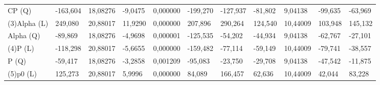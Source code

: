 \begin{table}[H]
{\begin{tabular}{lllllllllll}
\rowcolor[HTML]{FFFFFF} 
{\color[HTML]{000000} CP      (Q)}    & {\color[HTML]{FF0000} -163,604} & {\color[HTML]{FF0000} 18,08276} & {\color[HTML]{FF0000} -9,0475}  & {\color[HTML]{FF0000} 0,000000} & {\color[HTML]{FF0000} -199,270}       & {\color[HTML]{FF0000} -127,937}       & {\color[HTML]{FF0000} -81,802}  & {\color[HTML]{FF0000} 9,04138}       & {\color[HTML]{FF0000} -99,635}        & {\color[HTML]{FF0000} -63,969}        \\
\rowcolor[HTML]{FFFFFF} 
{\color[HTML]{000000} (3)Alpha   (L)} & {\color[HTML]{FF0000} 249,080}  & {\color[HTML]{FF0000} 20,88017} & {\color[HTML]{FF0000} 11,9290}  & {\color[HTML]{FF0000} 0,000000} & {\color[HTML]{FF0000} 207,896}        & {\color[HTML]{FF0000} 290,264}        & {\color[HTML]{FF0000} 124,540}  & {\color[HTML]{FF0000} 10,44009}      & {\color[HTML]{FF0000} 103,948}        & {\color[HTML]{FF0000} 145,132}        \\
\rowcolor[HTML]{FFFFFF} 
{\color[HTML]{000000} Alpha   (Q)}    & {\color[HTML]{FF0000} -89,869}  & {\color[HTML]{FF0000} 18,08276} & {\color[HTML]{FF0000} -4,9698}  & {\color[HTML]{FF0000} 0,000001} & {\color[HTML]{FF0000} -125,535}       & {\color[HTML]{FF0000} -54,202}        & {\color[HTML]{FF0000} -44,934}  & {\color[HTML]{FF0000} 9,04138}       & {\color[HTML]{FF0000} -62,767}        & {\color[HTML]{FF0000} -27,101}        \\
\rowcolor[HTML]{FFFFFF} 
{\color[HTML]{000000} (4)P       (L)} & {\color[HTML]{FF0000} -118,298} & {\color[HTML]{FF0000} 20,88017} & {\color[HTML]{FF0000} -5,6655}  & {\color[HTML]{FF0000} 0,000000} & {\color[HTML]{FF0000} -159,482}       & {\color[HTML]{FF0000} -77,114}        & {\color[HTML]{FF0000} -59,149}  & {\color[HTML]{FF0000} 10,44009}      & {\color[HTML]{FF0000} -79,741}        & {\color[HTML]{FF0000} -38,557}        \\
\rowcolor[HTML]{FFFFFF} 
{\color[HTML]{000000} P       (Q)}    & {\color[HTML]{FF0000} -59,417}  & {\color[HTML]{FF0000} 18,08276} & {\color[HTML]{FF0000} -3,2858}  & {\color[HTML]{FF0000} 0,001209} & {\color[HTML]{FF0000} -95,083}        & {\color[HTML]{FF0000} -23,750}        & {\color[HTML]{FF0000} -29,708}  & {\color[HTML]{FF0000} 9,04138}       & {\color[HTML]{FF0000} -47,542}        & {\color[HTML]{FF0000} -11,875}        \\
\rowcolor[HTML]{FFFFFF} 
{\color[HTML]{000000} (5)p0      (L)} & {\color[HTML]{FF0000} 125,273}  & {\color[HTML]{FF0000} 20,88017} & {\color[HTML]{FF0000} 5,9996}   & {\color[HTML]{FF0000} 0,000000} & {\color[HTML]{FF0000} 84,089}         & {\color[HTML]{FF0000} 166,457}        & {\color[HTML]{FF0000} 62,636}   & {\color[HTML]{FF0000} 10,44009}      & {\color[HTML]{FF0000} 42,044}         & {\color[HTML]{FF0000} 83,228}         \\

\end{tabular}}
\end{table}
